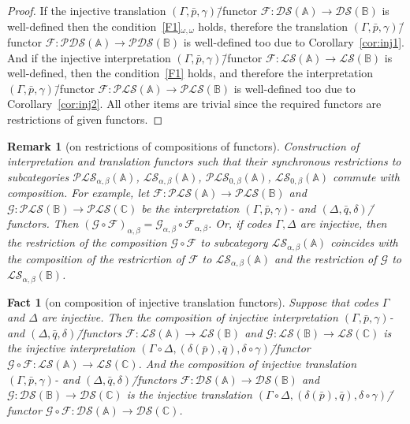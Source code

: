 \documentclass[12pt]{article}
\newtheorem{fact}{Fact}
\newtheorem{remark}{Remark}
\theoremstyle{definition}
\def\MA{{\mathbb{A}}}
\def\MB{{\mathbb{B}}}
\def\MC{{\mathbb{C}}}
\def\F{{\mathcal{F}}}
\def\G{{\mathcal{G}}}
\def\PLS{{\mathcal{PLS}}}
\def\PDS{{\mathcal{PDS}}}
\def\DS{{\mathcal{DS}}}
\def\LS{{\mathcal{LS}}}
\begin{document}
\begin{proof}
If the injective translation $(\Gamma,\bar p,\gamma)$\=/functor $\F\colon \DS(\MA)\to \DS(\MB)$ is well-defined then the condition~\ref{F1}$_{\omega,\omega}$ holds, therefore the translation $(\Gamma,\bar p,\gamma)$\=/functor $\F\colon \PDS(\MA)\to \PDS(\MB)$ is well-defined too due to Corollary~\ref{cor:inj1}. And if the injective interpretation $(\Gamma,\bar p,\gamma)$\=/functor $\F\colon \LS(\MA)\to \LS(\MB)$ is well-defined, then the condition~\ref{F1} holds, and therefore the interpretation $(\Gamma,\bar p,\gamma)$\=/functor $\F\colon \PLS(\MA)\to \PLS(\MB)$ is well-defined too due to Corollary~\ref{cor:inj2}. All other items are trivial since the required functors are restrictions of given functors.
\end{proof}

\begin{remark}[on restrictions of compositions of functors]\label{cor:comp_rest}
Construction of interpretation and translation functors such that their synchronous restrictions to subcategories $\PLS_{\alpha,\beta}(\MA)$, $\LS_{\alpha,\beta}(\MA)$, $\PLS_{0,\beta}(\MA)$, $\LS_{0,\beta}(\MA)$ commute with composition. For example, let $\F\colon \PLS(\MA)\to\PLS(\MB)$ and $\G\colon \PLS(\MB)\to \PLS(\MC)$ be the interpretation $(\Gamma,\bar p,\gamma)$- and $(\Delta,\bar q,\delta)$\=/functors. Then $(\G\circ\F)_{\alpha,\beta}=\G_{\alpha,\beta}\circ\F_{\alpha,\beta}$. Or, if 
codes $\Gamma,\Delta$ are injective, then the restriction of the composition $\G\circ\F$ to subcategory $\LS_{\alpha,\beta}(\MA)$ coincides with the composition of the restricrtion of $\F$ to $\LS_{\alpha,\beta}(\MA)$ and the restriction of $\G$ to $\LS_{\alpha,\beta}(\MB)$.
\end{remark}

\begin{fact}[on composition of injective translation functors] 
Suppose that codes $\Gamma$ and $\Delta$ are injective. Then the composition of injective interpretation $(\Gamma,\bar p,\gamma)$- and $(\Delta,\bar q,\delta)$\=/functors $\F\colon \LS(\MA)\to \LS(\MB)$ and $\G\colon \LS(\MB)\to \LS(\MC)$ is the injective interpretation $(\Gamma\circ\Delta,(\delta(\bar p),\bar q),\delta\circ\gamma)$\=/functor $\G\circ\F\colon \LS(\MA)\to \LS(\MC)$. And the composition of injective translation $(\Gamma,\bar p,\gamma)$- and $(\Delta,\bar q,\delta)$\=/functors $\F\colon \DS(\MA)\to \DS(\MB)$ and $\G\colon \DS(\MB)\to \DS(\MC)$ is the injective translation $(\Gamma\circ\Delta,(\delta(\bar p),\bar q),\delta\circ\gamma)$\=/functor $\G\circ\F\colon \DS(\MA)\to \DS(\MC)$. 
\end{fact}
\end{document}
